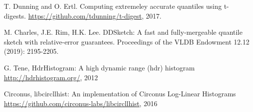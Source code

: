 \documentclass{article}
\theoremstyle{plain}
\theoremstyle{remark}
\begin{document}

\begin{thebibliography}{1}

T. Dunning and O. Ertl.
\newblock  Computing extremeley accurate quantiles using t-digests.
\newblock \url{https://github.com/tdunning/t-digest}, 2017.

M. Charles, J.E. Rim, H.K. Lee.
\newblock DDSketch: A fast and fully-mergeable quantile sketch with relative-error guarantees.
\newblock Proceedings of the VLDB Endowment 12.12 (2019): 2195-2205.

G. Tene,
\newblock HdrHistogram: A high dynamic range (hdr) histogram
\newblock \url{http://hdrhistogram.org/}, 2012

  Circonus,
  \newblock libcircllhist: An implementation of Circonus Log-Linear Histograms
  \newblock \url{https://github.com/circonus-labs/libcircllhist}, 2016

\end{thebibliography}
\end{document}
